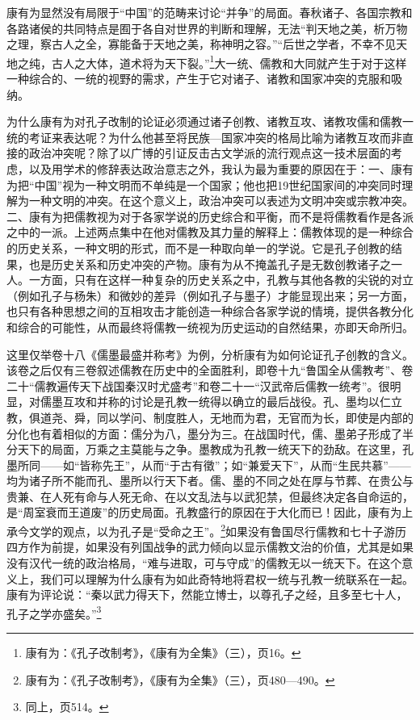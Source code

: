 \documentclass[a4paper, 12pt, openright]{ctexbook}
\begin{document}
康有为显然没有局限于“中国”的范畴来讨论“并争”的局面。春秋诸子、各国宗教和各路诸侯的共同特点是囿于各自对世界的判断和理解，无法“判天地之美，析万物之理，察古人之全，寡能备于天地之美，称神明之容。”“后世之学者，不幸不见天地之纯，古人之大体，道术将为天下裂。”\footnote{康有为：《孔子改制考》，《康有为全集》（三），页16。}大一统、儒教和大同就产生于对于这样一种综合的、一统的视野的需求，产生于它对诸子、诸教和国家冲突的克服和吸纳。

为什么康有为对孔子改制的论证必须通过诸子创教、诸教互攻、诸教攻儒和儒教一统的考证来表达呢？为什么他甚至将民族—国家冲突的格局比喻为诸教互攻而非直接的政治冲突呢？除了以广博的引证反击古文学派的流行观点这一技术层面的考虑，以及用学术的修辞表达政治意志之外，我认为最为重要的原因在于：一、康有为把“中国”视为一种文明而不单纯是一个国家；他也把19世纪国家间的冲突同时理解为一种文明的冲突。在这个意义上，政治冲突可以表述为文明冲突或宗教冲突。二、康有为把儒教视为对于各家学说的历史综合和平衡，而不是将儒教看作是各派之中的一派。上述两点集中在他对儒教及其力量的解释上：儒教体现的是一种综合的历史关系，一种文明的形式，而不是一种取向单一的学说。它是孔子创教的结果，也是历史关系和历史冲突的产物。康有为从不掩盖孔子是无数创教诸子之一人。一方面，只有在这样一种复杂的历史关系之中，孔教与其他各教的尖锐的对立（例如孔子与杨朱）和微妙的差异（例如孔子与墨子）才能显现出来；另一方面，也只有各种思想之间的互相攻击才能创造一种综合各家学说的情境，提供各教分化和综合的可能性，从而最终将儒教一统视为历史运动的自然结果，亦即天命所归。

这里仅举卷十八《儒墨最盛并称考》为例，分析康有为如何论证孔子创教的含义。该卷之后仅有三卷叙述儒教在历史中的全面胜利，即卷十九“鲁国全从儒教考”、卷二十“儒教遍传天下战国秦汉时尤盛考”和卷二十一“汉武帝后儒教一统考”。很明显，对儒墨互攻和并称的讨论是孔教一统得以确立的最后战役。孔、墨均以仁立教，俱道尧、舜，同以学问、制度胜人，无地而为君，无官而为长，即使是内部的分化也有着相似的方面：儒分为八，墨分为三。在战国时代，儒、墨弟子形成了半分天下的局面，万乘之主莫能与之争。墨教成为孔教一统天下的劲敌。在这里，孔墨所同——如“皆称先王”，从而“于古有徵”；如“兼爱天下”，从而“生民共慕”——均为诸子所不能而孔、墨所以行天下者。儒、墨的不同之处在厚与节葬、在贵公与贵兼、在人死有命与人死无命、在以文乱法与以武犯禁，但最终决定各自命运的，是“周室衰而王道废”的历史局面。孔教盛行的原因在于大化而已！因此，康有为上承今文学的观点，以为孔子是“受命之王”。\footnote{康有为：《孔子改制考》，《康有为全集》（三），页480—490。}如果没有鲁国尽行儒教和七十子游历四方作为前提，如果没有列国战争的武力倾向以显示儒教文治的价值，尤其是如果没有汉代一统的政治格局，“难与进取，可与守成”的儒教无以一统天下。在这个意义上，我们可以理解为什么康有为如此奇特地将君权一统与孔教一统联系在一起。康有为评论说：“秦以武力得天下，然能立博士，以尊孔子之经，且多至七十人，孔子之学亦盛矣。”\footnote{同上，页514。}
\end{document}
